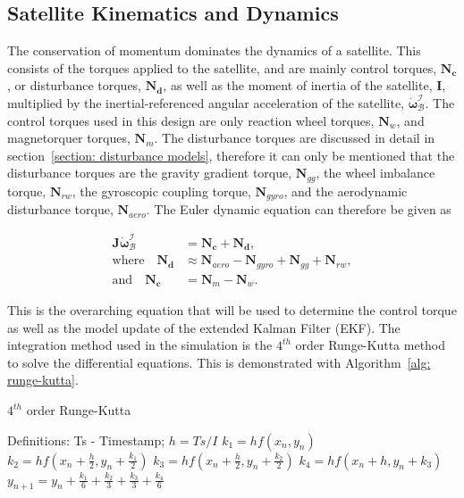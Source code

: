 \subsection{Satellite Kinematics and Dynamics}
The conservation of momentum dominates the dynamics of a satellite. This consists of the torques applied to the satellite, and are mainly control torques, $\mathbf{N_c}$, or disturbance torques, $\mathbf{N_d}$, as well as the moment of inertia of the satellite, $\mathbf{I}$, multiplied by the inertial-referenced angular acceleration of the satellite, $\boldsymbol{\dot{\omega}}_{\mathcal{B}}^{\mathcal{I}}$. The control torques used in this design are only reaction wheel torques, $\mathbf{N}_w$, and magnetorquer torques, $\mathbf{N}_m$. The disturbance torques are discussed in detail in section~\ref{section: disturbance models}, therefore it can only be mentioned that the disturbance torques are the gravity gradient torque, $\mathbf{N}_{gg}$, the wheel imbalance torque, $\mathbf{N}_{rw}$, the gyroscopic coupling torque, $\mathbf{N}_{gyro}$, and the aerodynamic disturbance torque, $\mathbf{N}_{aero}$. The Euler dynamic equation can therefore be given as

\begin{equation}
\begin{aligned}
	\mathbf{J}\boldsymbol{\dot{\omega}}_{\mathcal{B}}^{\mathcal{I}} &= \mathbf{N_c} + \mathbf{N_d}, \\
	\text{where} \quad \mathbf{N_d} &\approx \mathbf{N}_{aero} - \mathbf{N}_{gyro} + \mathbf{N}_{gg} + \mathbf{N}_{rw}, \\
	\text{and} \quad \mathbf{N_c} &= \mathbf{N}_{m} - \mathbf{N}_{w}.
\end{aligned}
\end{equation}

This is the overarching equation that will be used to determine the control torque as well as the model update of the extended Kalman Filter (EKF). The integration method used in the simulation is the $4^{th}$ order Runge-Kutta method to solve the differential equations. This is demonstrated with Algorithm~\ref{alg: runge-kutta}.

\begin{algorithm}[!htb]
	\caption[$4^{th}$ order Runge-Kutta]{$4^{th}$ order Runge-Kutta}
	\label{alg: runge-kutta}
	\begin{algorithmic}[1]
		\State Definitions: Ts - Timestamp; 
		\State $h = Ts/I$ 
		\State	$k_1 = hf(x_n, y_n)$
		\State	$k_2 = hf(x_n + \frac{h}{2}, y_n + \frac{k_1}{2})$
		\State	$k_3 = hf(x_n + \frac{h}{2}, y_n + \frac{k_2}{2})$
		\State	$k_4 = hf(x_n + h, y_n + k_3)$
		\State	$y_{n+1}=y_n + \frac{k_1}{6} + \frac{k_2}{3} + \frac{k_3}{3} + \frac{k_4}{6}$
		\EndFor

	\end{algorithmic}
\end{algorithm}

